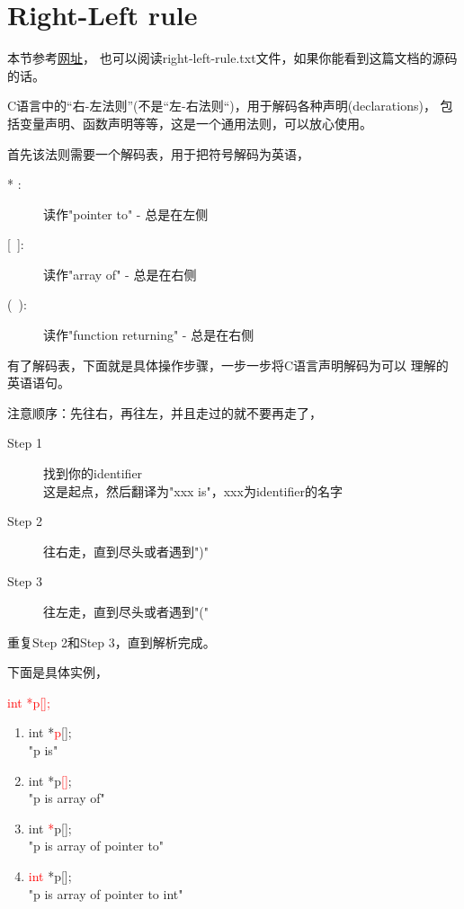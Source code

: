 ﻿\section[Right-Left rule]{Right-Left rule}
本节参考\href{http://ieng9.ucsd.edu/~cs30x/rt_lt.rule.html}{网址}，
也可以阅读right-left-rule.txt文件，如果你能看到这篇文档的源码的话。

C语言中的“右-左法则”(不是“左-右法则“)，用于解码各种声明(declarations)，
包括变量声明、函数声明等等，这是一个通用法则，可以放心使用。

首先该法则需要一个解码表，用于把符号解码为英语，
\begin{description}
  \item[{* }:] 读作"pointer to" - 总是在左侧
  \item[{[~]}:] 读作"array of" - 总是在右侧
  \item[{(~)}:] 读作"function returning" - 总是在右侧
\end{description}

有了解码表，下面就是具体操作步骤，一步一步将C语言声明解码为可以
理解的英语语句。

注意顺序：先往右，再往左，并且走过的就不要再走了，
\begin{description}
  \item[Step 1] 找到你的identifier\\
  这是起点，然后翻译为"xxx is"，xxx为identifier的名字
  \item[Step 2] 往右走，直到尽头或者遇到")"
  \item[Step 3] 往左走，直到尽头或者遇到"("
\end{description}
重复Step 2和Step 3，直到解析完成。

下面是具体实例，

\hspace{1cm}\textcolor{red}{int *p[];}

\begin{enumerate}
  \item int *\textcolor{red}{p}[];\\
  "p is"
  \item int *p\textcolor{red}{[]};\\
  "p is array of"
  \item int \textcolor{red}{*}p[];\\
  "p is array of pointer to"
  \item \textcolor{red}{int} *p[];\\
  "p is array of pointer to int"
\end{enumerate}
